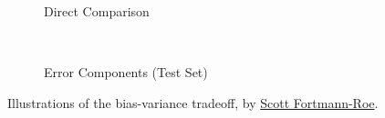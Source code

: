 \begin{figure}[H]
  \centering

  \begin{subfigure}[b]{0.48\textwidth}\centering
    \usebox{\largestimage}
    \vspace{0.01cm}
  \caption{Direct Comparison}
  \label{fig:ml:bias_variance_tradeoff:direct}
  \end{subfigure}
  ~
  \begin{subfigure}[b]{\wd\largestimage}\centering
  \caption{Error Components (Test Set)}
  \label{fig:ml:bias_variance_tradeoff:error}
  \end{subfigure}
\caption{
Illustrations of the bias-variance tradeoff,
by \href{http://scott.fortmann-roe.com/docs/BiasVariance.html}{Scott Fortmann-Roe}.
\label{fig:ml:bias_variance_tradeoff}
}
\end{figure}

